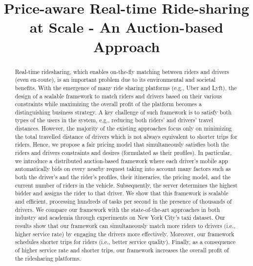 \documentclass[]{sig-alternate-05-2015}
\title{Price-aware Real-time Ride-sharing at Scale - An Auction-based Approach}
\author{}
\begin{document}
\maketitle

\begin{abstract}
Real-time ridesharing, which enables on-the-fly matching between riders and drivers (even en-route), is an important problem due to its environmental and societal benefits. With the emergence of many ride sharing platforms (e.g., Uber and Lyft), the design of a scalable framework to match riders and drivers based on their various constraints while maximizing the overall profit of the platform becomes a distinguishing business strategy.
A key challenge of such framework is to satisfy both types of the users in the system, e.g., reducing both riders' and drivers' travel distances. However, the majority of the existing approaches focus only on minimizing the total travelled distance of drivers which is not always equivalent to shorter trips for riders. Hence, we propose a fair pricing model that simultaneously satisfies both the riders and drivers constraints and desires (formulated as their profiles). In particular, we introduce a distributed auction-based framework where each driver's mobile app automatically bids on every nearby request taking into account many factors such as both the driver's and the rider's profiles, their itineraries, the pricing model, and the current number of riders in the vehicle.  Subsequently, the server determines the highest bidder and assigns the rider to that driver. We show that this framework is scalable and efficient, processing hundreds of tasks per second in the presence of thousands of drivers. We compare our framework with the state-of-the-art approaches in both industry and academia through experiments on New York City's taxi dataset.  Our results show that our framework can simultaneously match more riders to drivers (i.e., higher service rate) by engaging the drivers more effectively. Moreover, our framework schedules shorter trips for riders (i.e., better service quality).   Finally, as a consequence of higher service rate and shorter trips, our framework increases the overall profit of the ridesharing platforms. 

\end{abstract}



%






\vspace{-0.1in}

\begin{scriptsize}


\end{scriptsize}
\end{document}
